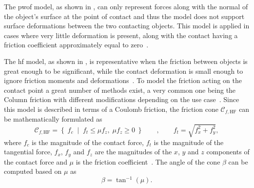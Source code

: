 The \gls{pwof} model, as shown in , can only represent forces along with the normal of the object's surface at the point of contact and thus the model does not support surface deformations between the two contacting objects. This model is applied in cases where very little deformation is present, along with the contact having a friction coefficient approximately equal to zero~\cite[Chapter 38]{handbook-of-robotics}.\medskip

The \gls{hf} model, as shown in , is representative when the friction between objects is great enough to be significant, while the contact deformation is small enough to ignore friction moments and deformations~\cite[Chapter 38]{handbook-of-robotics}. To model the friction acting on the contact point a great number of methods exist, a very common one being the Column friction with different modifications depending on the use case~\cite{modelling-of-joint-friction-in-robotic-manipulators-with-gear-transmissions}. Since this model is described in terms of a Coulomb friction, the friction cone $\mathcal{C}_{f,\text{HF}}$ can be mathematically formulated as
%
\begin{equation} 
	\mathcal{C}_{f,\text{HF}} = \left\{ \; f_c\; \middle|\; f_{t} \le \mu f_z,\; \mu f_z \ge 0 \; \right\} \qquad , \qquad f_t = \sqrt{f_x^2 + f_y^2},
	\label{eq:hf}
\end{equation}
where $f_c$ is the magnitude of the contact force, $f_t$ is the magnitude of the tangential force, $f_x$, $f_y$ and $f_z$ are the magnitudes of the $x$, $y$ and $z$ components of the contact force and $\mu$ is the friction coefficient~\cite[Chapter 37]{handbook-of-robotics}. The angle of the cone $\beta$ can be computed based on $\mu$ as
%
\begin{equation} 
	\beta = \tan^{-1} (\mu).
	\label{eq:hf-cone-angle}
\end{equation}

